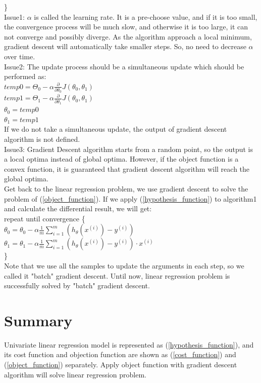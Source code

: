 \documentclass{article}
\begin{document}
\}\\
Issue1: $\alpha$ is called the learning rate. It is a pre-choose value, and if it is too small, the convergence process will be much slow, and otherwise it is too large, it can not converge and possibly diverge. As the algorithm approach a local minimum, gradient descent will automatically take smaller steps. So, no need to decrease $\alpha$ over time.\\
Issue2: The update process should be a simultaneous update which should be performed as:\\
$temp0=\Theta_0 - \alpha\frac{\partial}{\partial \theta_0}J(\theta_0, \theta_1)$\\
$temp1=\Theta_1 - \alpha\frac{\partial}{\partial \theta_1}J(\theta_0, \theta_1)$\\
$\theta_0 = temp0$\\
$\theta_1 = temp1$\\
If we do not take a simultaneous update, the output of gradient descent algorithm is not defined.\\
Issue3: Gradient Descent algorithm starts from a random point, so the output is a local optima instead of global optima. However, if the object function is a convex function, it is guaranteed that gradient descent algorithm will reach the global optima.\\
Get back to the linear regression problem, we use gradient descent to solve the problem of (\ref{object_function}). If we apply (\ref{hypothesis_function}) to algorithm1 and calculate the differential result, we will get:\\
repeat until convergence \{\\
$\theta_0=\theta_0 - \alpha \frac{1}{m} \sum_{i=1}^{m}(h_\theta(x^{(i)})-y^{(i)})$\\
$\theta_1=\theta_1 - \alpha \frac{1}{m} \sum_{i=1}^{m}(h_\theta(x^{(i)})-y^{(i)}) \cdot x^{(i)}$\\
\}\\
Note that we use all the samples to update the arguments in each step, so we called it "batch" gradient descent. Until now, linear regression problem is successfully solved by "batch" gradient descent.

\section{Summary}
Univariate linear regression model is represented as (\ref{hypothesis_function}), and its cost function and objection function are shown as (\ref{cost_function}) and (\ref{object_function}) separately. Apply object function with gradient descent algorithm will solve linear regression problem.
\end{document}
